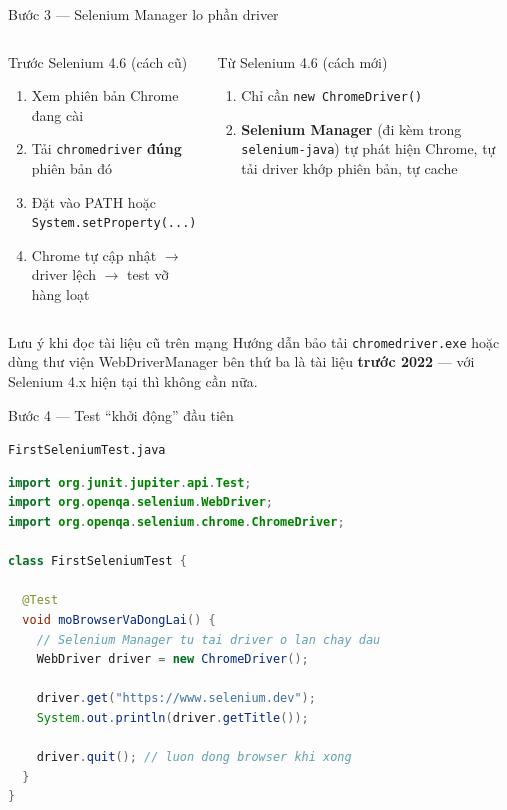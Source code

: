 \documentclass[aspectratio=169,12pt]{beamer}
\begin{document}
\begin{frame}{Bước 3 --- Selenium Manager lo phần driver}
  \begin{columns}[T]
    \begin{block}{Trước Selenium 4.6 (cách cũ)}
      \begin{enumerate}
        \item Xem phiên bản Chrome đang cài
        \item Tải \texttt{chromedriver} \textbf{đúng} phiên bản đó
        \item Đặt vào PATH hoặc \texttt{System.setProperty(...)}
        \item Chrome tự cập nhật $\to$ driver lệch $\to$ test vỡ hàng loạt
      \end{enumerate}
    \end{block}

    \begin{block}{Từ Selenium 4.6 (cách mới)}
      \begin{enumerate}
        \item Chỉ cần \texttt{new ChromeDriver()}
        \item \textbf{Selenium Manager} (đi kèm trong \texttt{selenium-java})
              tự phát hiện Chrome, tự tải driver khớp phiên bản, tự cache
      \end{enumerate}
    \end{block}
  \end{columns}

  \vspace{0.3em}
  \begin{alertblock}{Lưu ý khi đọc tài liệu cũ trên mạng}
    Hướng dẫn bảo tải \texttt{chromedriver.exe} hoặc dùng thư viện
    WebDriverManager bên thứ ba là tài liệu \textbf{trước 2022} ---
    với Selenium 4.x hiện tại thì không cần nữa.
  \end{alertblock}
\end{frame}

\begin{frame}[fragile]{Bước 4 --- Test ``khởi động'' đầu tiên}
  \begin{exampleblock}{\texttt{FirstSeleniumTest.java}}
\begin{lstlisting}[language=java,basicstyle=\ttfamily\scriptsize]
import org.junit.jupiter.api.Test;
import org.openqa.selenium.WebDriver;
import org.openqa.selenium.chrome.ChromeDriver;

class FirstSeleniumTest {

  @Test
  void moBrowserVaDongLai() {
    // Selenium Manager tu tai driver o lan chay dau
    WebDriver driver = new ChromeDriver();

    driver.get("https://www.selenium.dev");
    System.out.println(driver.getTitle());

    driver.quit(); // luon dong browser khi xong
  }
}
\end{lstlisting}
  \end{exampleblock}
\end{frame}
\end{document}
